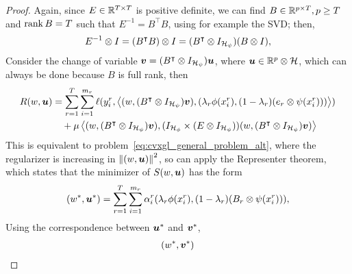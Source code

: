 \begin{proof}
Again, since ${E} \in \mathbb{R}^{T \times T}$ is positive definite, we can find $B \in \mathbb{R}^{p \times T}, p \geq T$ and $\operatorname{rank}{B} = T$ such that $E^{-1} = 
{B^\intercal} {B}$, using for example the SVD;
% 
then,  
$$ E^{-1} \otimes I = (B^\intercal B) \otimes I = (B^\intercal \otimes I_{\mathcal{H}_\psi}) (B \otimes I),$$
%
Consider the change of variable $\bm{v} = (B^\intercal \otimes I_{\mathcal{H}_\psi}) \bm{u}$, where $\bm{u} \in \mathbb{R}^p \otimes \mathcal{H}$, which can always be done because 
$B$ is full rank, then
\begin{equation}
    \nonumber
    \begin{aligned}
        R(w, \bm{u}) &= \sum_{r=1}^{T} \sum_{i=1}^{m_r} \ell(y_i^r, \left\langle (w, (B^\intercal \otimes I_{\mathcal{H}_\psi}) \bm{v}),  (\lambda_r \phi(x_i^r), (1 - \lambda_r) (e_r \otimes \psi(x_i^r))) \right\rangle) \\
        &\quad + \mu \left\langle (w, (B^\intercal \otimes I_{\mathcal{H}_\psi})\bm{v}), (I_{\mathcal{H}_\phi} \times (E \otimes I_{\mathcal{H}_\psi})) (w, (B^\intercal \otimes I_{\mathcal{H}_\psi}) \bm{v})  \right\rangle \\
    \end{aligned}
\end{equation}
This is equivalent to problem~\eqref{eq:cvxgl_general_problem_alt}, where the regularizer is increasing in $\left\lVert(w, \bm{u})\right\rVert^2$, so can apply the Representer theorem, which states that the minimizer of $S(w, \bm{u})$ has the form
\begin{equation}
    \nonumber
    (w^*, \bm{u}^*) = \sum_{r=1}^T \sum_{i=1}^{m_r} \alpha_i^r (\lambda_r \phi(x_i^r), (1-\lambda_r) (B_r \otimes \psi(x_i^r))) ,
\end{equation}
Using the correspondence between $\bm{u}^*$ and $\bm{v}^*$, 
\begin{equation}\nonumber
    \begin{aligned}
        (w^*, \fv{v}^*) 

\end{aligned}
\end{equation}
\end{proof}

